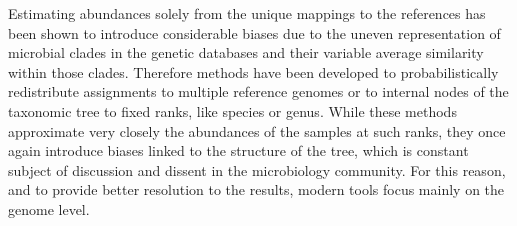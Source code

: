 Estimating abundances solely from the unique mappings to the references has been shown to introduce considerable biases \cite{lu_bracken:_2017} due to the uneven representation of microbial clades in the genetic databases and their variable average similarity within those clades. Therefore methods have been developed to probabilistically redistribute assignments to multiple reference genomes or to internal nodes of the taxonomic tree to fixed ranks, like species or genus. While these methods approximate very closely the abundances of the samples at such ranks, they once again introduce biases linked to the structure of the tree, which is constant subject of discussion and dissent in the microbiology community. For this reason, and to provide better resolution to the results, modern tools focus mainly on the genome level.
